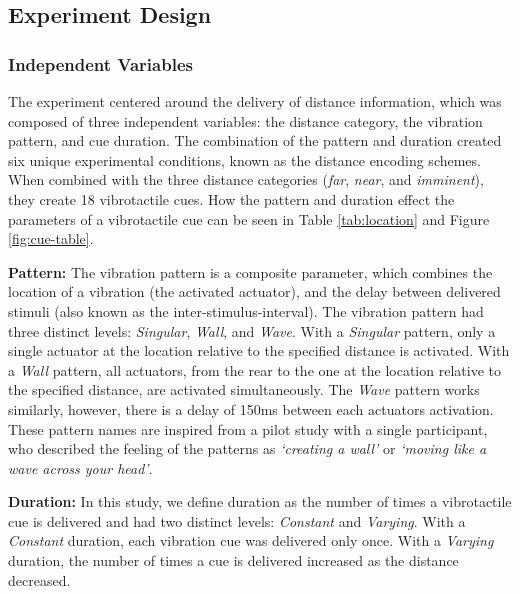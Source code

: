 \documentclass{mpaper}
\begin{document}
\subsection{Experiment Design}
\subsubsection{Independent Variables}
The experiment centered around the delivery of distance information, which was composed of three independent variables: the distance category, the vibration pattern, and cue duration. The combination of the pattern and duration created six unique experimental conditions, known as the distance encoding schemes. When combined with the three distance categories (\textit{far}, \textit{near}, and \textit{imminent}), they create 18 vibrotactile cues. How the pattern and duration effect the parameters of a vibrotactile cue can be seen in Table \ref{tab:location} and Figure \ref{fig:cue-table}.

\textbf{Pattern:} The vibration pattern is a composite parameter, which combines the location of a vibration (the activated actuator), and the delay between delivered stimuli (also known as the inter-stimulus-interval). The vibration pattern had three distinct levels: \textit{Singular}, \textit{Wall}, and \textit{Wave}. With a \textit{Singular} pattern, only a single actuator at the location relative to the specified distance is activated. With a \textit{Wall} pattern, all actuators, from the rear to the one at the location relative to the specified distance, are activated simultaneously. The \textit{Wave} pattern works similarly, however, there is a delay of 150ms between each actuators activation. These pattern names are inspired from a pilot study with a single participant, who described the feeling of the patterns as \textit{‘creating a wall’} or \textit{‘moving like a wave across your head’}. 

\textbf{Duration:} In this study, we define duration as the number of times a vibrotactile cue is delivered and had two distinct levels: \textit{Constant} and \textit{Varying}. With a \textit{Constant} duration, each vibration cue was delivered only once. With a \textit{Varying} duration, the number of times a cue is delivered increased as the distance decreased. 
\end{document}
